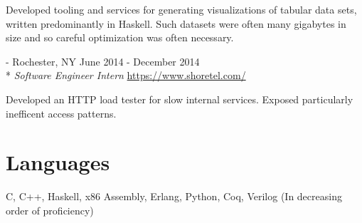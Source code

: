 \documentclass[letterpaper,margin,line,11pt]{resume}
\newcommand{\rurl}[1]{\hfill {\footnotesize \url{#1}}}
\newcommand{\rdate}[1]{\hfill {\small #1}}
\renewcommand{\employer}[5]{\item[#1] - #2 \rdate{#3} \\* #4 \rurl{#5}}
\begin{document}
\begin{resume}
\begin{asparadesc}
        \small
        Developed tooling and services for generating visualizations of tabular data sets, written predominantly in
        Haskell. Such datasets were often many gigabytes in size and so careful optimization was often necessary.
        \normalsize
        \\

        \employer{ShoreTel}{Rochester, NY}{June 2014 - December 2014}{\textit{Software Engineer Intern}}{https://www.shoretel.com/}

        \small
        Developed an HTTP load tester for slow internal services. Exposed particularly inefficent access patterns.
        \normalsize
    \end{asparadesc}

\section{\mysidestyle Languages}
    C, C++, Haskell, x86 Assembly, Erlang, Python, Coq, Verilog
    \hfill 
    \footnotesize 
    (In decreasing order of proficiency)
    \normalsize


\end{resume}
\end{document}
